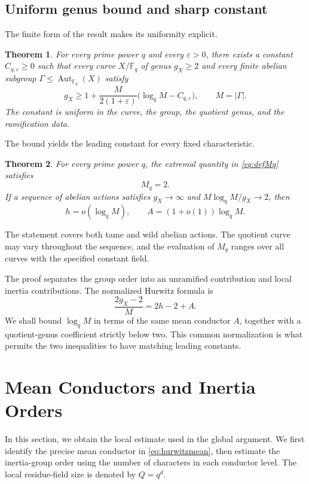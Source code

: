 \documentclass[12pt,onecolumn,draftclsnofoot,letterpaper]{IEEEtran}
\newtheorem{theorem}{Theorem}
\theoremstyle{remark}
\newcommand{\F}{\mathbb F}
\newcommand{\Aut}{\operatorname{Aut}}
\begin{document}
\subsection{Uniform genus bound and sharp constant}
The finite form of the result makes its uniformity explicit.
\begin{theorem}\label{thm:finite}
For every prime power $q$ and every $\varepsilon>0$, there exists a constant $C_{q,\varepsilon}\ge0$ such that every curve $X/\F_q$ of genus $g_X\ge2$ and every finite abelian subgroup $\Gamma\le\Aut_{\F_q}(X)$ satisfy
\begin{equation}
 g_X\ge1+\frac{M}{2(1+\varepsilon)}
       \bigl(\log_qM-C_{q,\varepsilon}\bigr),
 \qquad M=|\Gamma|.
 \label{eq:main}
\end{equation}
The constant is uniform in the curve, the group, the quotient genus, and the ramification data.
\end{theorem}
The bound yields the leading constant for every fixed characteristic.
\begin{theorem}\label{thm:exact}
For every prime power $q$, the extremal quantity in \eqref{eq:defMq} satisfies
\begin{equation}
 M_q=2.
 \label{eq:exact}
\end{equation}
If a sequence of abelian actions satisfies $g_X\to\infty$ and
$M\log_qM/g_X\to2$, then
\begin{equation}
 h=o(\log_qM),\qquad A=(1+o(1))\log_qM.
 \label{eq:extremal}
\end{equation}
\end{theorem}
The statement covers both tame and wild abelian actions. The quotient curve may vary throughout the sequence, and the evaluation of $M_q$ ranges over all curves with the specified constant field.

The proof separates the group order into an unramified contribution and local inertia contributions. The normalized Hurwitz formula is
\begin{equation}
 \frac{2g_X-2}{M}=2h-2+A.
 \label{eq:hurwitzmean}
\end{equation}
We shall bound $\log_qM$ in terms of the same mean conductor $A$, together with a quotient-genus coefficient strictly below two. This common normalization is what permits the two inequalities to have matching leading constants.

\section{Mean Conductors and Inertia Orders}\label{sec:local}
In this section, we obtain the local estimate used in the global argument. We first identify the precise mean conductor in \eqref{eq:hurwitzmean}, then estimate the inertia-group order using the number of characters in each conductor level. The local residue-field size is denoted by $Q=q^d$.
\end{document}
